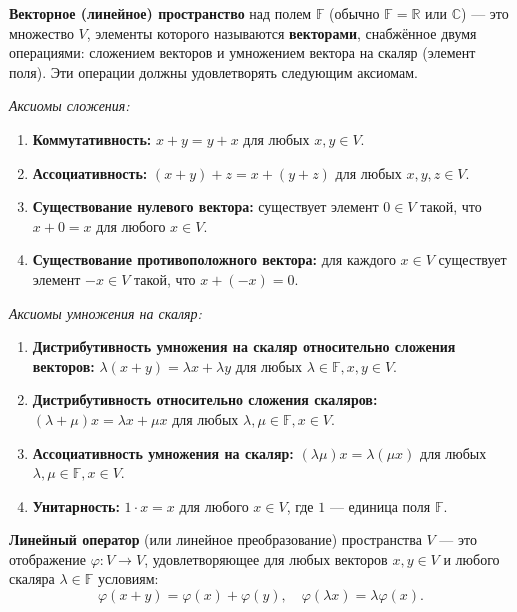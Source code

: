 \begin{definition}
    \textbf{Векторное (линейное) пространство} над полем $\mathbb{F}$ (обычно $\mathbb{F} = \mathbb{R}$ или $\mathbb{C}$) — это множество $V$, элементы которого называются \textbf{векторами}, снабжённое двумя операциями: сложением векторов и умножением вектора на скаляр (элемент поля). Эти операции должны удовлетворять следующим аксиомам.

\textit{Аксиомы сложения:}

\begin{enumerate}
    \item \textbf{Коммутативность:} $x + y = y + x$ для любых $x, y \in V$.
    \item \textbf{Ассоциативность:} $(x + y) + z = x + (y + z)$ для любых $x, y, z \in V$.
    \item \textbf{Существование нулевого вектора:} существует элемент $0 \in V$ такой, что $x + 0 = x$ для любого $x \in V$.
    \item \textbf{Существование противоположного вектора:} для каждого $x \in V$ существует элемент $-x \in V$ такой, что $x + (-x) = 0$.
\end{enumerate}

\textit{Аксиомы умножения на скаляр:}

\begin{enumerate}
    \item \textbf{Дистрибутивность умножения на скаляр относительно сложения векторов:} $\lambda(x + y) = \lambda x + \lambda y$ для любых $\lambda \in \mathbb{F}, x, y \in V$.
    \item \textbf{Дистрибутивность относительно сложения скаляров:} $(\lambda + \mu)x = \lambda x + \mu x$ для любых $\lambda, \mu \in \mathbb{F}, x \in V$.
    \item \textbf{Ассоциативность умножения на скаляр:} $(\lambda\mu)x = \lambda(\mu x)$ для любых $\lambda, \mu \in \mathbb{F}, x \in V$.
    \item \textbf{Унитарность:} $1 \cdot x = x$ для любого $x \in V$, где $1$ — единица поля $\mathbb{F}$.
\end{enumerate}
\end{definition}

\begin{definition}
\textbf{Линейный оператор} (или линейное преобразование) пространства $V$ — это отображение $\varphi : V \to V$, удовлетворяющее для любых векторов $x, y \in V$ и любого скаляра $\lambda \in \mathbb{F}$ условиям:
$$ \varphi(x + y) = \varphi(x) + \varphi(y), \quad \varphi(\lambda x) = \lambda\varphi(x). $$
\end{definition}


